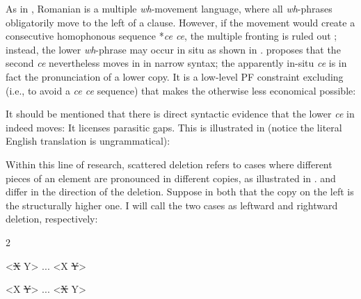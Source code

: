 \documentclass[output=paper,colorlinks,citecolor=brown
]{langscibook}
\begin{document}
 As in , Romanian is a multiple \textit{wh}-movement language, where all \textit{wh}-phrases obligatorily move to the left of a clause. However, if the movement would create a consecutive homophonous sequence *\textit{ce ce}, the multiple fronting is ruled out ; instead, the lower \textit{wh}-phrase may occur in situ as shown in . \citet{bovskovic2002multiple} proposes that the second \textit{ce} nevertheless moves in  in narrow syntax; the apparently in-situ \textit{ce} is in fact the pronunciation of a lower copy. It is a low-level PF constraint excluding  (i.e., to avoid a \textit{ce ce} sequence) that makes the otherwise less economical  possible:

\z

 It should be mentioned that there is direct syntactic evidence that the lower \textit{ce} in  indeed moves: It licenses parasitic gaps. This is illustrated in  (notice the literal English translation is ungrammatical):

\label{ex:chen:PG}
\z

 Within this line of research, scattered deletion refers to cases where different pieces of an element are pronounced in different copies, as illustrated in .  and  differ in the direction of the deletion. Suppose in both that the copy on the left is the structurally higher one. I will call the two cases as leftward and rightward deletion, respectively:

\begin{multicols}{2}

\ea\label{ex:chen:SD}
  \begin{xlist}
  \ex <\sout{X} Y> ... <X \sout{Y}>\label{ex:chen:SD1}
  \saveex
  \end{xlist}
\z

\columnbreak

\begin{exe}
\sn
  \begin{xlist}
  \resumeex
  \ex <X \sout{Y}> ... <\sout{X} Y>\label{ex:chen:SD2}
  \end{xlist}
\end{exe}

\end{multicols}
\end{document}
